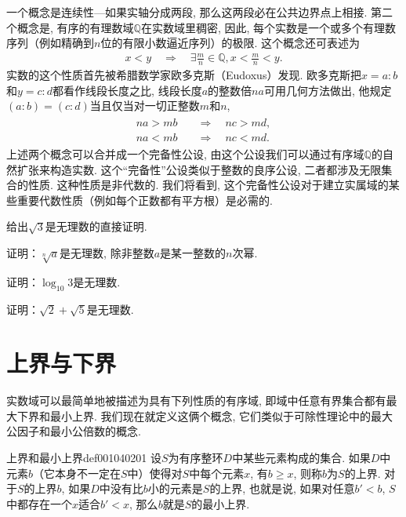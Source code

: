 一个概念是连续性---如果实轴分成两段, 那么这两段必在公共边界点上相接. 第二个概念是, 有序的有理数域$\mathbb{Q}$在实数域里稠密, 因此, 每个实数是一个或多个有理数序列（例如精确到$n$位的有限小数逼近序列）的极限. 这个概念还可表述为
\begin{gather}\label{equ001040102}
x < y \quad \Rightarrow\quad \exists \frac{m}{n} \in \mathbb{Q}, x < \frac{m}{n} < y.
\end{gather}
实数的这个性质首先被希腊数学家欧多克斯（Eudoxus）发现. 欧多克斯把$x=a:b$和$y=c:d$都看作线段长度之比, 线段长度$a$的整数倍$na$可用几何方法做出, 他规定$(a:b)=(c:d)$当且仅当对一切正整数$m$和$n$, 
\begin{gather}\label{equ001040103}
\begin{aligned}
na > mb \quad &\Rightarrow \quad nc > md, \\
na < mb \quad &\Rightarrow \quad nc < md.
\end{aligned}
\end{gather}
上述两个概念可以合并成一个完备性公设, 由这个公设我们可以通过有序域$\mathbb{Q}$的自然扩张来构造实数. 这个“完备性”公设类似于整数的良序公设, 二者都涉及无限集合的性质. 这种性质是非代数的. 我们将看到, 这个完备性公设对于建立实属域的某些重要代数性质（例如每个正数都有平方根）是必需的. 

\begin{problem}
给出$\sqrt{3}$是无理数的直接证明. 
\end{problem}

\begin{problem}
证明：$\sqrt[n]{a}$是无理数, 除非整数$a$是某一整数的$n$次幂. 
\end{problem}

\begin{problem}
证明：$\log_{10}{3}$是无理数. 
\end{problem}

\begin{problem}
证明：$\sqrt{2} + \sqrt{5}$是无理数. 
\end{problem}



\section{上界与下界}\label{section0010402}
实数域可以最简单地被描述为具有下列性质的有序域, 即域中任意有界集合都有最大下界和最小上界. 我们现在就定义这俩个概念, 它们类似于可除性理论中的最大公因子和最小公倍数的概念. 

\begin{definition}{上界和最小上界}{def001040201}
设$S$为有序整环$D$中某些元素构成的集合. 如果$D$中元素$b$（它本身不一定在$S$中）使得对$S$中每个元素$x$, 有$b \ge x$, 则称$b$为$S$的上界. 对于$S$的上界$b$, 如果$D$中没有比$b$小的元素是$S$的上界, 也就是说, 如果对任意$b' < b$, $S$中都存在一个$x$适合$b'<x$, 那么$b$就是$S$的最小上界. 
\end{definition}

